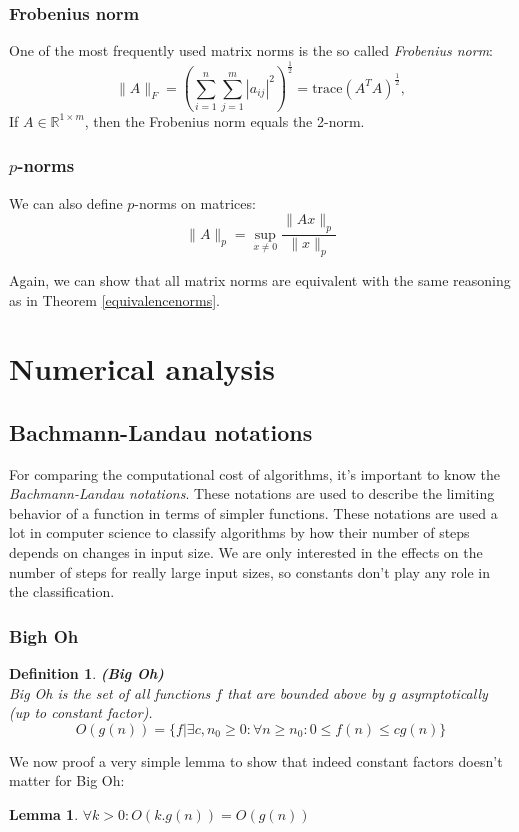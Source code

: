 \documentclass[a4paper,11pt]{report}
\newtheorem{lemma}[theorem]{Lemma}
\newtheorem{definition}[theorem]{Definition}
\newcommand{\R}{{\mathbb R}}
\begin{document}
\subsubsection{Frobenius norm}
One of the most frequently used matrix norms is the so called \textit{Frobenius norm}:
$$\|A\|_F = \left(\sum_{i=1}^n \sum_{j=1}^m |a_{ij}|^2\right)^{\frac{1}{2}} = \text{trace}(A^TA)^{\frac{1}{2}} ,$$
If $A \in \R^{1\times m}$, then the Frobenius norm equals the 2-norm.

\subsubsection{$p$-norms}
We can also define $p$-norms on matrices:
$$\|A\|_p = \sup_{x\not = 0} \frac{\|Ax\|_p}{\|x\|_p}$$

Again, we can show that all matrix norms are equivalent with the same reasoning 
as in Theorem \ref{equivalencenorms}.

\section{Numerical analysis}
\subsection{Bachmann-Landau notations}
For comparing the computational cost of algorithms, 
it's important to know the \emph{Bachmann-Landau notations}. These notations are used to describe the limiting behavior of a function in terms of simpler functions. 
These notations are used a lot in computer science to classify algorithms by how their number of steps depends on changes in input size. 
We are only interested in the effects on the number of steps for really large input sizes, so constants don't play any role in the classification.

\subsubsection{Bigh Oh}
\begin{definition}\textbf{(Big Oh)}\\
Big Oh is the set of all functions $f$ that are bounded above by $g$ asymptotically (up to constant factor).
$$O(g(n)) = \{f|\exists c, n_0 \geq 0: \forall n \geq n_0 : 0 \leq f(n) \leq cg(n)\}$$
\end{definition}
We now proof a very simple lemma to show that indeed constant factors doesn't matter for Big Oh:
\begin{lemma}\label{constanten}
$\forall k > 0: O(k.g(n)) = O(g(n))$
\end{lemma}
\end{document}
